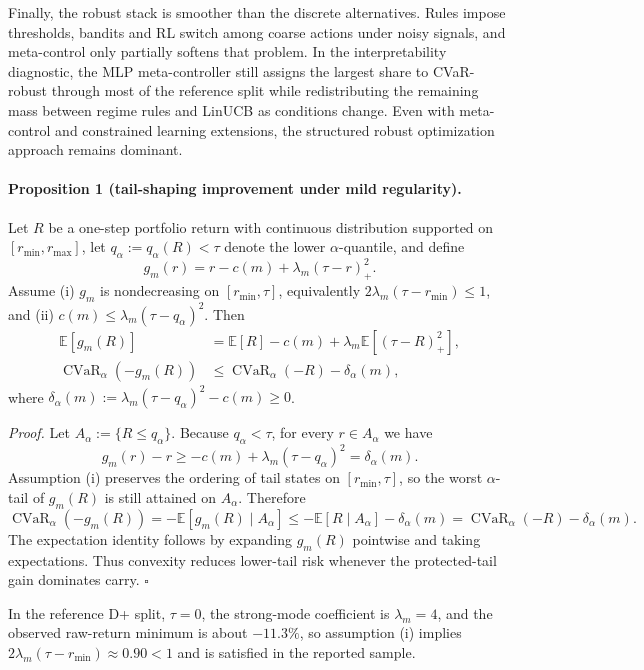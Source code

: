 \documentclass[11pt]{article}
\begin{document}
Finally, the robust stack is smoother than the discrete alternatives. Rules
impose thresholds, bandits and RL switch among coarse actions under noisy
signals, and meta-control only partially softens that problem. In the
interpretability diagnostic, the MLP meta-controller still assigns the largest
share to CVaR-robust through most of the reference split while redistributing
the remaining mass between regime rules and LinUCB as conditions change. Even
with meta-control and constrained learning extensions, the structured robust
optimization approach remains dominant.

\paragraph{Proposition 1 (tail-shaping improvement under mild regularity).}
Let $R$ be a one-step portfolio return with continuous distribution supported on
$[r_{\min}, r_{\max}]$, let $q_\alpha:=q_\alpha(R)<\tau$ denote the lower
$\alpha$-quantile, and define
\[
g_m(r)=r-c(m)+\lambda_m(\tau-r)_+^2.
\]
Assume (i) $g_m$ is nondecreasing on $[r_{\min},\tau]$, equivalently
$2\lambda_m(\tau-r_{\min})\le 1$, and (ii)
$c(m)\le \lambda_m(\tau-q_\alpha)^2$. Then
\begin{align*}
\mathbb{E}[g_m(R)]
&=\mathbb{E}[R]-c(m)+\lambda_m \mathbb{E}\!\left[(\tau-R)_+^2\right], \\
\operatorname{CVaR}_\alpha(-g_m(R))
&\le \operatorname{CVaR}_\alpha(-R)-\delta_\alpha(m),
\end{align*}
where $\delta_\alpha(m):=\lambda_m(\tau-q_\alpha)^2-c(m)\ge 0$.

\emph{Proof.} Let $A_\alpha:=\{R\le q_\alpha\}$. Because $q_\alpha<\tau$, for
every $r\in A_\alpha$ we have
\[
g_m(r)-r \ge -c(m)+\lambda_m(\tau-q_\alpha)^2 = \delta_\alpha(m).
\]
Assumption (i) preserves the ordering of tail states on $[r_{\min},\tau]$, so
the worst $\alpha$-tail of $g_m(R)$ is still attained on $A_\alpha$. Therefore
\[
\operatorname{CVaR}_\alpha(-g_m(R))
= -\mathbb{E}[g_m(R)\mid A_\alpha]
\le -\mathbb{E}[R\mid A_\alpha]-\delta_\alpha(m)
= \operatorname{CVaR}_\alpha(-R)-\delta_\alpha(m).
\]
The expectation identity follows by expanding $g_m(R)$ pointwise and taking
expectations. Thus convexity reduces lower-tail risk whenever the protected-tail
gain dominates carry. \hfill $\square$

In the reference D+ split, $\tau=0$, the strong-mode coefficient is $\lambda_m=4$, and the observed raw-return minimum is about $-11.3\%$, so assumption (i) implies $2\lambda_m(\tau-r_{\min})\approx 0.90<1$ and is satisfied in the reported sample.
\end{document}
